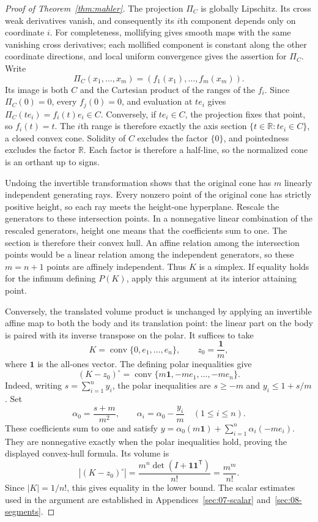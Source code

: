 \begin{proof}[Proof of Theorem~\ref{thm:mahler}]
The projection \(\Pi_C\) is globally Lipschitz.  Its cross weak
derivatives vanish, and consequently its \(i\)th component depends only
on coordinate \(i\).  For completeness, mollifying gives smooth maps
with the same vanishing cross derivatives; each mollified component is
constant along the other coordinate directions, and local uniform
convergence gives the assertion for \(\Pi_C\).  Write
\[
 \Pi_C(x_1,\ldots,x_m)=(f_1(x_1),\ldots,f_m(x_m)).
\]
Its image is both \(C\) and the Cartesian product of the ranges of the
\(f_i\). Since \(\Pi_C(0)=0\), every \(f_j(0)=0\), and evaluation
at \(t e_i\) gives \(\Pi_C(t e_i)=f_i(t)e_i\in C\).
Conversely, if \(t e_i\in C\), the projection fixes that point, so
\(f_i(t)=t\). The \(i\)th range is therefore exactly the axis section
\(\{t\in\mathbb R:t e_i\in C\}\), a closed convex cone.
Solidity of \(C\) excludes the factor \(\{0\}\), and pointedness
excludes the factor \(\mathbb R\).  Each factor is therefore a half-line,
so the normalized cone is an orthant up to signs.

Undoing the invertible transformation shows that the original cone has
\(m\) linearly independent generating rays.  Every nonzero point of the
original cone has strictly positive height, so each ray meets the
height-one hyperplane. Rescale the generators to these intersection
points. In a nonnegative linear combination of the rescaled generators,
height one means that the coefficients sum to one. The section is
therefore their convex hull. An affine relation among the intersection
points would be a linear relation among the independent generators, so
these \(m=n+1\) points are affinely independent. Thus \(K\) is a simplex.
If equality holds for the infimum defining \(P(K)\), apply this argument
at its interior attaining point.

Conversely, the translated volume product is unchanged by applying an
invertible affine map to both the body and its translation point: the
linear part on the body is paired with its inverse transpose on the polar.
It suffices to take
\[
 K=\operatorname{conv}\{0,e_1,\ldots,e_n\},
 \qquad z_0=\frac{\mathbf1}{m},
\]
where \(\mathbf1\) is the all-ones vector.  The defining polar inequalities
give
\[
 (K-z_0)^\circ
   =\operatorname{conv}\{m\mathbf1,-m e_1,\ldots,-m e_n\}.
\]
Indeed, writing \(s=\sum_{i=1}^n y_i\), the polar inequalities are
\(s\ge-m\) and \(y_i\le1+s/m\). Set
\[
 \alpha_0=\frac{s+m}{m^2},\qquad
 \alpha_i=\alpha_0-\frac{y_i}{m}\quad(1\le i\le n).
\]
These coefficients sum to one and satisfy
\(y=\alpha_0(m\mathbf1)+\sum_{i=1}^n\alpha_i(-m e_i)\).
They are nonnegative exactly when the polar inequalities hold, proving
the displayed convex-hull formula. Its volume is
\[
 |(K-z_0)^\circ|
   =\frac{m^n\det(I+\mathbf1\mathbf1^{\mathsf T})}{n!}
   =\frac{m^m}{n!}.
\]
Since \(|K|=1/n!\), this gives equality in the lower bound.  The scalar
estimates used in the argument are established in
Appendices~\ref{sec:07-scalar} and~\ref{sec:08-segments}.
\end{proof}
